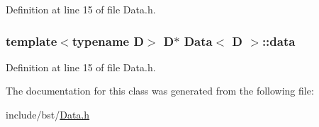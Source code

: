 Definition at line 15 of file Data.\+h.

\hypertarget{class_data_a7ae58514cc4d78cafedcb2dd7d0bf907}{
\subsubsection[{data}]{\setlength{\rightskip}{0pt plus 5cm}template$<$typename D$>$ {\bf D}$\ast$ {\bf Data}$<$ {\bf D} $>$\+::data}}\label{class_data_a7ae58514cc4d78cafedcb2dd7d0bf907}


Definition at line 15 of file Data.\+h.



The documentation for this class was generated from the following file\+:\begin{DoxyCompactItemize}
\item 
include/bst/\hyperlink{bst_2_data_8h}{Data.\+h}\end{DoxyCompactItemize}
